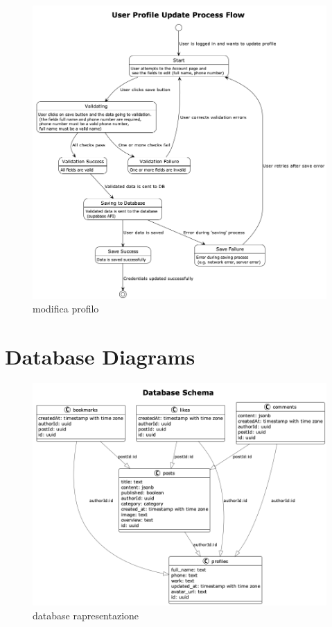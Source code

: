 \documentclass{article}
\begin{document}
    \begin{figure}[h]
        \lefting
        \includegraphics[width=1\textwidth]{modifica_profilo_flow}
        \caption{modifica profilo}
        \label{fig:figure2}
    \end{figure}

    \clearpage
    \section{Database Diagrams}
    \label{sec:database_diagrams}

    \begin{figure}[h]
        \lefting
        \includegraphics[width=1\textwidth]{database}
        \caption{database rapresentazione}
        \label{fig:figure}
    \end{figure}
\end{document}
